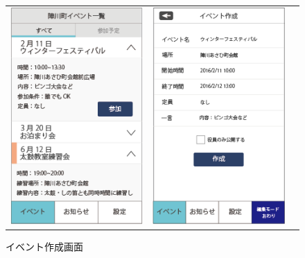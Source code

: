 \newpage%
\begin{figure}[h]
    \begin{tabular}{ccc}
      \begin{minipage}[t]{0.3\hsize}
        \centering
        \includegraphics[keepaspectratio, scale=0.5]{process_figures/eventlist.png}
        \caption{イベントリスト画面}
        \label{eventlist}
      \end{minipage} &
      \begin{minipage}[t]{0.3\hsize}
        \centering
        \includegraphics[keepaspectratio, scale=0.5]{process_figures/new_create_event.png}
        \caption{イベント作成画面}
        \label{new_create_event}

\end{minipage}
\end{tabular}
\end{figure}
